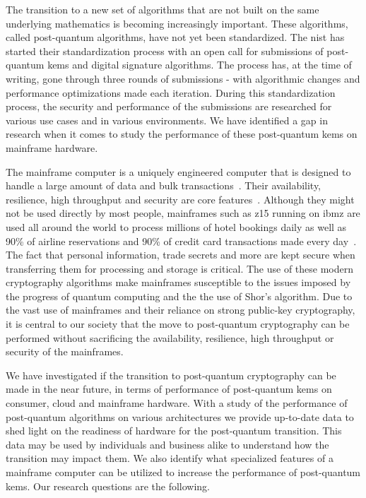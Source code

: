The transition to a new set of algorithms that are not built on the same underlying mathematics is becoming increasingly important. These algorithms, called \gls{post-quantum} algorithms, have not yet been standardized. The \acrfull{nist} has started their standardization process with an open call for submissions of \gls{post-quantum} \glspl{kem} and digital signature algorithms. The process has, at the time of writing, gone through three rounds of submissions - with algorithmic changes and performance optimizations made each iteration. During this standardization process, the security and performance of the submissions are researched for various use cases and in various environments. We have identified a gap in research when it comes to study the performance of these \gls{post-quantum} \glspl{kem} on mainframe hardware.

The mainframe computer is a uniquely engineered computer that is designed to handle a large amount of data and bulk transactions~\cite{mainframes}. Their availability, resilience, high throughput and security are core features~\cite{mainframes}. Although they might not be used directly by most people, mainframes such as \gls{z15} running on \gls{ibmz} are used all around the world to process millions of hotel bookings daily as well as 90\% of airline reservations and 90\% of credit card transactions made every day~\cite{jacobi2020}. The fact that personal information, trade secrets and more are kept secure when transferring them for processing and storage is critical. The use of these modern cryptography algorithms make mainframes susceptible to the issues imposed by the progress of quantum computing and the the use of Shor's algorithm. Due to the vast use of mainframes and their reliance on strong public-key cryptography, it is central to our society that the move to \gls{post-quantum} cryptography can be performed without sacrificing the availability, resilience, high throughput or security of the mainframes.

We have investigated if the transition to \gls{post-quantum} cryptography can be made in the near future, in terms of performance of \gls{post-quantum} \glspl{kem} on consumer, cloud and mainframe hardware. With a study of the performance of \gls{post-quantum} algorithms on various architectures we provide up-to-date data to shed light on the readiness of hardware for the \gls{post-quantum} transition. This data may be used by individuals and business alike to understand how the transition may impact them. We also identify what specialized features of a mainframe computer can be utilized to increase the performance of \gls{post-quantum} \glspl{kem}. Our research questions are the following.

